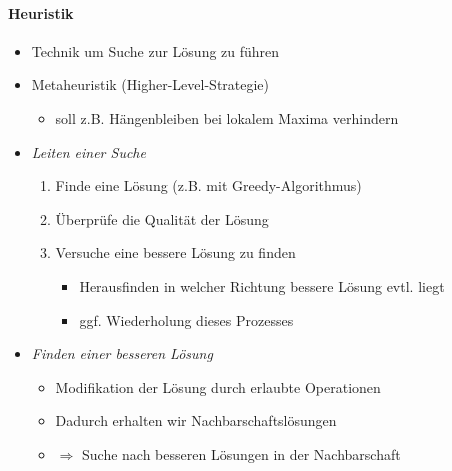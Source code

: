 \documentclass[
    ngerman,
    color=3b,
    dark_mode,
    load_common, %
    summary,
    boxarc,
]{tuda_summary}
\begin{document}
\paragraph{Heuristik}
\begin{itemize}
    \item Technik um Suche zur Lösung zu führen
    \item Metaheuristik (Higher-Level-Strategie)
          \begin{itemize}
              \item soll z.B. Hängenbleiben bei lokalem Maxima verhindern
          \end{itemize}
    \item \textit{Leiten einer Suche}
          \begin{enumerate}
              \item Finde eine Lösung (z.B. mit Greedy-Algorithmus)
              \item Überprüfe die Qualität der Lösung
              \item Versuche eine bessere Lösung zu finden
                    \begin{itemize}
                        \item Herausfinden in welcher Richtung bessere Lösung evtl. liegt
                        \item ggf. Wiederholung dieses Prozesses
                    \end{itemize}
          \end{enumerate}
    \item \textit{Finden einer besseren Lösung}
          \begin{itemize}
              \item Modifikation der Lösung durch erlaubte Operationen
              \item Dadurch erhalten wir Nachbarschaftslösungen
              \item[] $\Rightarrow$ Suche nach besseren Lösungen in der Nachbarschaft
          \end{itemize}
\end{itemize}
\clearpage
\end{document}
